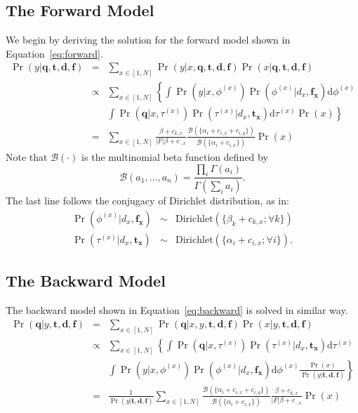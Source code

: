 \subsection{The Forward Model}\label{ss:forward-model}
We begin by deriving the solution for the forward model shown in
Equation~\eqref{eq:forward}. 
\begin{eqnarray}
  \Pr(y|\mathbf{q}, \mathbf{t}, \mathbf{d}, \mathbf{f}) 
  &=& \sum_{x \in [1, N]} \Pr(y|x, \mathbf{q}, \mathbf{t}, \mathbf{d}, \mathbf{f}) \Pr(x|\mathbf{q}, \mathbf{t}, \mathbf{d}, \mathbf{f}) \nonumber\\
  &\propto& \sum_{x \in [1, N]} \left\{ \int \Pr(y|x, \phi^{(x)}) \Pr(\phi^{(x)}|d_x, \mathbf{f_x}) \mathrm{d}\phi^{(x)} \right. \nonumber\\
  && \left. \int \Pr(\mathbf{q}| x, \tau^{(x)}) \Pr(\tau^{(x)}|d_x, \mathbf{t_x})\mathrm{d}\tau^{(x)} \Pr(x) \right\} \nonumber\\
  &=& \sum_{x \in [1, N]} \frac{\beta + c_{k,x}}{|F|\beta + c_{\cdot,x}} \frac{\mathcal{B}(\{\alpha_i + c_{i,x} + c_{i,q} \})}{\mathcal{B}(\{\alpha_i + c_{i,x} \})} \Pr(x)
\end{eqnarray}
Note that $\mathcal{B}(\cdot)$ is the multinomial beta
function defined by \[\mathcal{B}(a_1, \ldots, a_n) = \frac{\prod_i
\Gamma(a_i)}{\Gamma(\sum_i a_i)}. \]
The last line follows the conjugacy of Dirichlet distribution, as in:
\begin{eqnarray*}
\Pr(\phi^{(x)}|d_x,\mathbf{f_x}) &\sim& \mathrm{Dirichlet}(\{\beta_k + c_{k,x}; \forall k \}) \\
\Pr(\tau^{(x)}|d_x, \mathbf{t_x}) &\sim& \mathrm{Dirichlet}(\{\alpha_i + c_{i,x}; \forall i \}).
\end{eqnarray*}

\subsection{The Backward Model}\label{ss:backward-model}
The backward model shown in Equation~\eqref{eq:backward} is solved in similar way.
\begin{eqnarray}
  \Pr(\mathbf{q}|y, \mathbf{t}, \mathbf{d}, \mathbf{f}) 
  &=& \sum_{x \in [1, N]} \Pr(\mathbf{q}|x, y, \mathbf{t}, \mathbf{d}, \mathbf{f}) \Pr(x|y, \mathbf{t}, \mathbf{d}, \mathbf{f}) \nonumber\\
  &\propto& \sum_{x \in [1, N]} \left\{ \int \Pr(\mathbf{q}|x, \tau^{(x)}) \Pr(\tau^{(x)}|d_x, \mathbf{t_x}) \mathrm{d}\tau^{(x)} \right. \nonumber\\
  && \left. \int \Pr(y| x, \phi^{(x)}) \Pr(\phi^{(x)}|d_x, \mathbf{f_x})\mathrm{d}\phi^{(x)} \frac{\Pr(x)}{\Pr(y|\mathbf{t}, \mathbf{d}, \mathbf{f})} \right\} \nonumber\\
  &=& \frac{1}{\Pr(y|\mathbf{t}, \mathbf{d}, \mathbf{f})} \sum_{x \in [1, N]} \frac{\mathcal{B}(\{\alpha_i + c_{i,x} + c_{i,q} \})}{\mathcal{B}(\{\alpha_i + c_{i,x} \})} \frac{\beta + c_{k,x}}{|F|\beta + c_{\cdot,x}} \Pr(x) \nonumber
\end{eqnarray}

